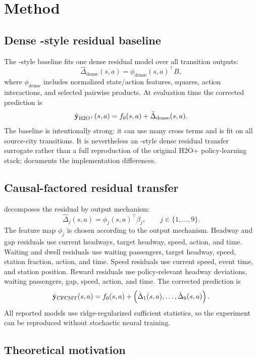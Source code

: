 \section{Method}

\subsection{Dense \Htwo-style residual baseline}

The \Htwo-style baseline fits one dense residual model over all transition outputs:
\[
    \hat \Delta_{\mathrm{dense}}(s,a) = \phi_{\mathrm{dense}}(s,a)^\top B,
\]
where $\phi_{\mathrm{dense}}$ includes normalized state/action features, squares, action interactions, and selected pairwise products.
At evaluation time the corrected prediction is
\[
    \hat {\mathbf{y}}_{\mathrm{H2O}^{+}}(s,a) = f_0(s,a) + \hat \Delta_{\mathrm{dense}}(s,a).
\]
The baseline is intentionally strong: it can use many cross terms and is fit on all source-city transitions.
It is nevertheless an \Htwo-style dense residual transfer surrogate rather than a full reproduction of the original H2O+ policy-learning stack;  documents the implementation differences.

\subsection{Causal-factored residual transfer}

\ours decomposes the residual by output mechanism:
\[
    \hat \Delta_j(s,a) = \phi_j(s,a)^\top \beta_j, \qquad j \in \{1,\ldots,9\}.
\]
The feature map $\phi_j$ is chosen according to the output mechanism.
Headway and gap residuals use current headways, target headway, speed, action, and time.
Waiting and dwell residuals use waiting passengers, target headway, speed, station fraction, action, and time.
Speed residuals use current speed, event time, and station position.
Reward residuals use policy-relevant headway deviations, waiting passengers, gap, speed, action, and time.
The corrected prediction is
\[
    \hat {\mathbf{y}}_{\mathrm{CFCMT}}(s,a)
    = f_0(s,a) +
      \left(\hat\Delta_1(s,a),\ldots,\hat\Delta_9(s,a)\right).
\]
All reported models use ridge-regularized sufficient statistics, so the experiment can be reproduced without stochastic neural training.

\subsection{Theoretical motivation}


